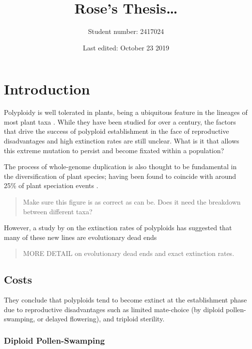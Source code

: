 \documentclass[openany, 12pt, draft]{book}
\title{Rose's Thesis\ldots{}}
\author{Student number: 2417024}
\date{Last edited: October 23 2019}
\begin{document}
\maketitle

{
\setcounter{tocdepth}{1}
\tableofcontents
}
\chapter{Introduction}\label{intro}

Polyploidy is well tolerated in plants, being a ubiquitous feature in
the lineages of most plant taxa \citep{Ramsey2014}. While they have been
studied for over a century, the factors that drive the success of
polyploid establishment in the face of reproductive disadvantages and
high extinction rates are still unclear. What is it that allows this
extreme mutation to persist and become fixated within a population?

The process of whole-genome duplication is also thought to be
fundamental in the diversification of plant species; having been found
to coincide with around 25\% of plant speciation events
\citep{Wood2009}.

\begin{quote}
Make sure this figure is as correct as can be. Does it need the
breakdown between different taxa?
\end{quote}

However, a study by \citet{Arrigo2012} on the extinction rates of
polyploids has suggested that many of these new lines are evolutionary
dead ends

\begin{quote}
MORE DETAIL on evolutionary dead ends and exact extinction rates.
\end{quote}

\section{Costs}\label{costs}

They conclude that polyploids tend to become extinct at the
establishment phase due to reproductive disadvantages such as limited
mate-choice (by diploid pollen-swamping, or delayed flowering), and
triploid sterility.

\subsection{Diploid Pollen-Swamping}\label{diploid-pollen-swamping}
\end{document}
